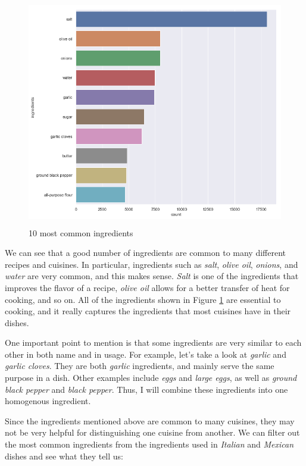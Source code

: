 \documentclass[12pt]{article}
\begin{document}
\begin{figure}[!h]
\includegraphics[width=\textwidth, height=10cm]{10-most-common-ingredients.png}
\caption{10 most common ingredients}
\label{fig:common-ingredients}
\end{figure}

We can see that a good number of ingredients are common to many different recipes and cuisines. In particular, ingredients such as \textit{salt}, \textit{olive oil}, \textit{onions}, and \textit{water} are very common, and this makes sense. \textit{Salt} is one of the ingredients that improves the flavor of a recipe, \textit{olive oil} allows for a better transfer of heat for cooking, and so on. All of the ingredients shown in Figure \ref{fig:common-ingredients} are essential to cooking, and it really captures the ingredients that most cuisines have in their dishes.

One important point to mention is that some ingredients are very similar to each other in both name and in usage. For example, let's take a look at \textit{garlic} and \textit{garlic cloves}. They are both \textit{garlic} ingredients, and mainly serve the same purpose in a dish. Other examples include \textit{eggs} and \textit{large eggs}, as well as \textit{ground black pepper} and \textit{black pepper}. Thus, I will combine these ingredients into one homogenous ingredient.

Since the ingredients mentioned above are common to many cuisines, they may not be very helpful for distinguishing one cuisine from another. We can filter out the most common ingredients from the ingredients used in \textit{Italian} and \textit{Mexican} dishes and see what they tell us:
\end{document}

